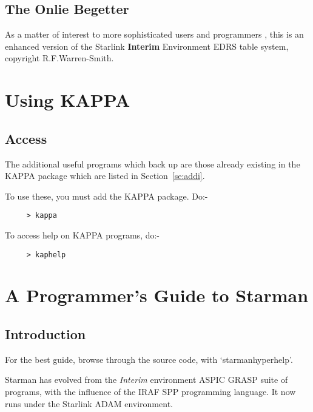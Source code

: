 \subsection{The Onlie Begetter}

As a matter of interest to more sophisticated users and programmers ,
this is an enhanced version of the Starlink {\bf Interim} Environment
EDRS table system, copyright R.F.Warren-Smith.





\section{Using KAPPA } \label{se:packs}

\subsection{Access}

The additional useful programs which back up \starman are those already
existing in the KAPPA package which are listed in
Section~\ref{se:addi}.

To use these, you must add the KAPPA package. Do:-

\begin{verbatim}
     > kappa \end{verbatim}

To access help on KAPPA programs, do:-

\begin{verbatim}
     > kaphelp \end{verbatim}



\section { A Programmer's Guide to Starman}

\subsection{Introduction}

For the best guide, browse through the source code, with
`starmanhyperhelp'.

Starman has evolved from the {\it Interim} environment ASPIC GRASP
suite of programs, with the influence of the IRAF SPP programming
language.  It now runs under the Starlink ADAM environment.

